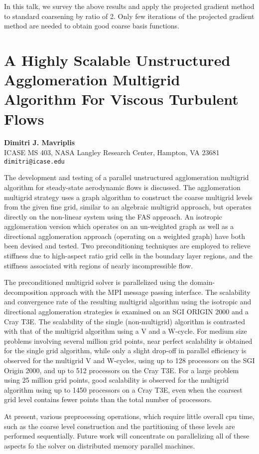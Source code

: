 \documentclass[11pt]{article}
\newcommand{\nextab}[4]{
	\section{#2}
	{\bf #1} \\ \nopagebreak
	{#3} \\ \nopagebreak
	{\tt #4} \nopagebreak
	}
\begin{document}
In this talk, we survey the above results and apply the projected gradient
method to standard coarsening by ratio of 2. Only few iterations of the
projected gradient method are needed to obtain good coarse basis functions.


\nextab{Dimitri J. Mavriplis}
	{A Highly Scalable Unstructured Agglomeration Multigrid
		Algorithm For Viscous Turbulent Flows}
	{ICASE MS 403,
	NASA Langley Research Center,
	Hampton, VA 23681}
	{dimitri@icase.edu}

The development and testing of a parallel unstructured agglomeration
multigrid algorithm for steady-state aerodynamic flows is discussed.
The agglomeration multigrid strategy uses a graph algorithm
to construct the coarse multigrid levels from the given fine grid,
similar to an algebraic multigrid approach,
but operates directly on the non-linear system using the FAS approach.
An isotropic agglomeration version which operates on an un-weighted
graph as well as a directional agglomeration approach
(operating on a weighted graph) have both been devised and tested.
Two preconditioning techniques are employed to relieve stiffness
due to high-aspect ratio grid cells in the boundary layer regions,
and the stiffness associated with regions of nearly incompressible flow.

The preconditioned multigrid solver is parallelized using
the domain-decomposition approach with the MPI message passing interface.
The scalability and convergence rate of the resulting multigrid algorithm
using the isotropic and directional agglomeration strategies is examined
on an SGI ORIGIN 2000 and a Cray T3E.  The scalability of the
single (non-multigrid) algorithm is contrasted with that of the multigrid
algorithm using a V and a W-cycle.  For medium size problems involving
several million grid points, near perfect scalability is obtained for the single
grid algorithm, while only a slight drop-off in parallel efficiency is observed
for the multigrid V and W-cycles, using up to 128 processors on the
SGI Origin 2000, and up to 512 processors on the Cray T3E.
For a large problem using 25 million grid points, good scalability
is observed for the multigrid algorithm
using up to 1450 processors on a Cray T3E, even when the coarsest grid level
contains fewer points than the total number of processors.

At present, various preprocessing operations, which
require little overall cpu time, such as the coarse level
construction and the partitioning of these levels
are performed sequentially.  Future work will concentrate
on parallelizing all of these aspects fo the solver on distributed
memory parallel machines.
\end{document}
